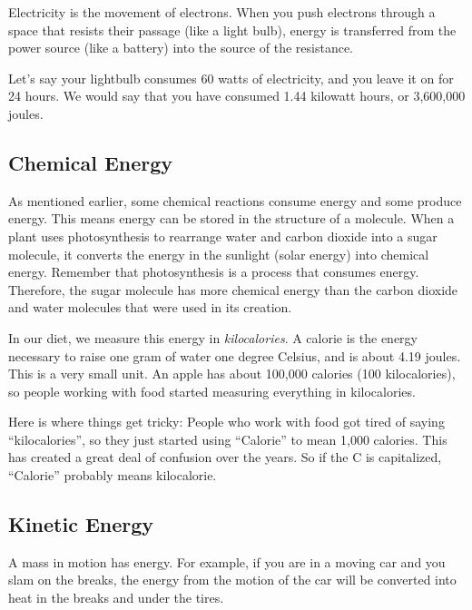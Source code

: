 Electricity is the movement of electrons. When you push electrons through a space 
that resists their passage (like a light bulb), energy is transferred from the 
power source (like a battery) into the source of the resistance.

Let's say your lightbulb consumes 60 watts of electricity, and you leave it on 
for 24 hours. We would say that you have consumed 1.44 kilowatt hours, or 
3,600,000 joules.


\subsection{Chemical Energy}

As mentioned earlier, some chemical reactions consume energy and some produce 
energy. This means energy can be stored in the structure of a molecule. When a 
plant uses photosynthesis to rearrange water and carbon dioxide into a sugar 
molecule, it converts the energy in the sunlight (solar energy) into chemical 
energy. Remember that photosynthesis is a process that consumes energy. 
Therefore, the sugar molecule has more chemical energy than the carbon dioxide 
and water molecules that were used in its creation.

In our diet, we measure this energy in \textit{kilocalories}. A calorie is the 
energy necessary to raise one gram of water one degree Celsius, and is about 
4.19 joules. This is a very small unit. An apple has about 100,000 calories (100 
kilocalories), so people working with food started measuring everything in kilocalories.

Here is where things get tricky: People who work with food got tired of saying 
``kilocalories'', so they just started using ``Calorie'' to mean 1,000 calories. 
This has created a great deal of confusion over the years. So if the C is capitalized,
 ``Calorie'' probably means kilocalorie.

\subsection{Kinetic Energy}

A mass in motion has energy. For example, if you are in a moving car and you slam 
on the breaks, the energy from the motion of the car will be converted into heat 
in the breaks and under the tires.


